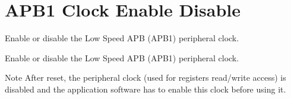 \hypertarget{group___r_c_c_ex___a_p_b1___clock___enable___disable}{}\section{A\+P\+B1 Clock Enable Disable}
\label{group___r_c_c_ex___a_p_b1___clock___enable___disable}


Enable or disable the Low Speed A\+PB (A\+P\+B1) peripheral clock.  


Enable or disable the Low Speed A\+PB (A\+P\+B1) peripheral clock. 

\begin{DoxyNote}{Note}
After reset, the peripheral clock (used for registers read/write access) is disabled and the application software has to enable this clock before using it. 
\end{DoxyNote}
